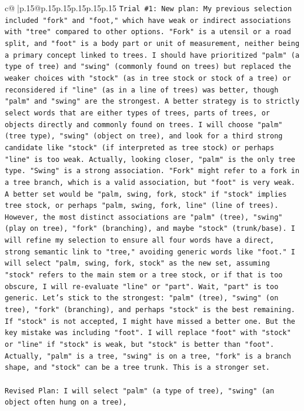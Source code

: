 \documentclass{article}
\begin{document}
{\begin{supertabular}{c@{$\;$}|p{.15\linewidth}@{}p{.15\linewidth}p{.15\linewidth}p{.15\linewidth}p{.15\linewidth}p{.15\linewidth}}
{{{\texttt{Trial \#1: New plan: My previous selection included "fork" and "foot," which have weak or indirect associations with "tree" compared to other options. "Fork" is a utensil or a road split, and "foot" is a body part or unit of measurement, neither being a primary concept linked to trees. I should have prioritized "palm" (a type of tree) and "swing" (commonly found on trees) but replaced the weaker choices with "stock" (as in tree stock or stock of a tree) or reconsidered if "line" (as in a line of trees) was better, though "palm" and "swing" are the strongest. A better strategy is to strictly select words that are either types of trees, parts of trees, or objects directly and commonly found on trees. I will choose "palm" (tree type), "swing" (object on tree), and look for a third strong candidate like "stock" (if interpreted as tree stock) or perhaps "line" is too weak. Actually, looking closer, "palm" is the only tree type. "Swing" is a strong association. "Fork" might refer to a fork in a tree branch, which is a valid association, but "foot" is very weak. A better set would be "palm, swing, fork, stock" if "stock" implies tree stock, or perhaps "palm, swing, fork, line" (line of trees). However, the most distinct associations are "palm" (tree), "swing" (play on tree), "fork" (branching), and maybe "stock" (trunk/base). I will refine my selection to ensure all four words have a direct, strong semantic link to "tree," avoiding generic words like "foot." I will select "palm, swing, fork, stock" as the new set, assuming "stock" refers to the main stem or a tree stock, or if that is too obscure, I will re{-}evaluate "line" or "part". Wait, "part" is too generic. Let's stick to the strongest: "palm" (tree), "swing" (on tree), "fork" (branching), and perhaps "stock" is the best remaining. If "stock" is not accepted, I might have missed a better one. But the key mistake was including "foot". I will replace "foot" with "stock" or "line" if "stock" is weak, but "stock" is better than "foot". Actually, "palm" is a tree, "swing" is on a tree, "fork" is a branch shape, and "stock" can be a tree trunk. This is a stronger set.} \\
\\ 
\texttt{Revised Plan: I will select "palm" (a type of tree), "swing" (an object often hung on a tree),} \\
\\ 
}}}
\end{supertabular}}
\end{document}
